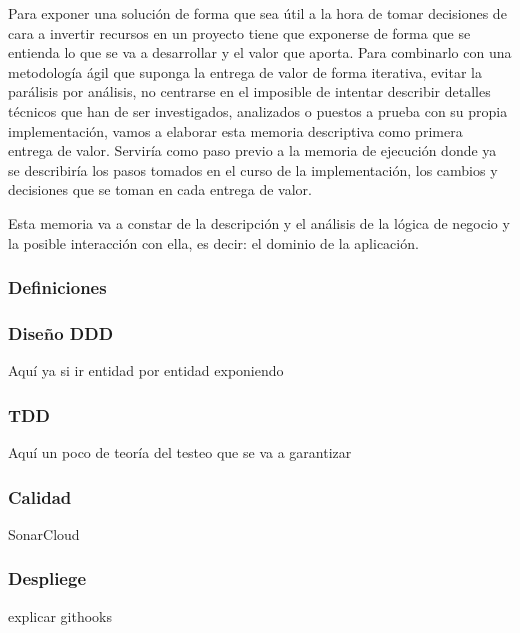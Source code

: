 Para exponer una solución de forma que sea útil a la hora de tomar decisiones de cara a invertir recursos en un proyecto tiene que exponerse de forma que se entienda lo que se va a desarrollar y el valor que aporta. Para combinarlo con una metodología ágil que suponga la entrega de valor de forma iterativa, evitar la parálisis por análisis, no centrarse en el imposible de intentar describir detalles técnicos que han de ser investigados, analizados o puestos a prueba con su propia implementación, vamos a elaborar esta memoria descriptiva como primera entrega de valor. Serviría como paso previo a la memoria de ejecución donde ya se describiría los pasos tomados en el curso de la implementación, los cambios y decisiones que se toman en cada entrega de valor.

Esta memoria va a constar de la descripción y el análisis de la lógica de negocio y la posible interacción con ella, es decir: el dominio de la aplicación.
\subsubsection{Definiciones}
    
\subsubsection{Diseño DDD}
Aquí ya si ir entidad por entidad exponiendo
\subsubsection{TDD}
Aquí un poco de teoría del testeo que se va a garantizar
\subsubsection{Calidad}
SonarCloud
\subsubsection{Despliege}
explicar githooks


